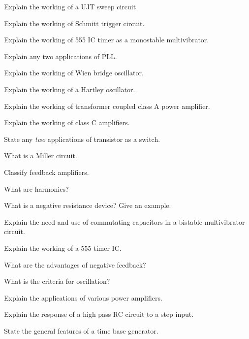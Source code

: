 \markB

\newpage \again

\partC

\item
\iitem Explain the working of a UJT sweep circuit
\Or
\item Explain the working of Schmitt trigger circuit.
\ene

\item 
\iitem Explain the working of 555 IC timer as a monostable multivibrator.
\Or
\item Explain any two applications of PLL.
\ene

\item
\iitem Explain the working of Wien bridge oscillator.
\Or
\item  Explain the working of a Hartley oscillator.
\ene

\item
\iitem Explain the working of transformer coupled class A power amplifier.
\Or
\item Explain the working of class C amplifiers.
\ene

\markC
\ene

\newpage

\sub{\subj}
\maxtime

\partA

\iitem State any {\em two} applications of transistor as a switch.
\item What is a Miller circuit.
\item Classify feedback amplifiers.
\item What are harmonics?
\item What is a negative resistance device? Give an example.

\markA
\partB

\item Explain the need and use of commutating capacitors in a bistable multivibrator circuit.
\item Explain the working of a 555 timer IC.
\item \iitem What are the advantages of negative feedback?
\item What is the criteria for oscillation?
\ene
\item Explain the applications of various power amplifiers.
\item Explain the response of a high pass RC circuit to a step input.
\item State the general features of a time base generator.

